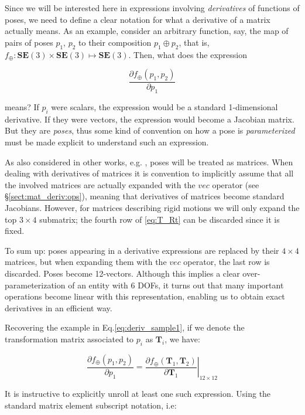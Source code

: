 \documentclass[a4paper,11pt]{report}
\begin{document}
Since we will be interested here in expressions involving \emph{derivatives} of functions of poses,
we need to define a clear notation for what a derivative of a matrix actually means.
As an example, consider an arbitrary function, say,
the map of pairs of poses $p_1$, $p_2$ to their composition $p_1 \oplus p_2$, that is,
$f_\oplus: \mathbf{SE}(3) \times \mathbf{SE}(3) \mapsto \mathbf{SE}(3)$.
Then, what does the expression

\begin{equation}
\label{eq:deriv_sample1}
\frac{\partial f_\oplus(p_1,p_2)}{\partial p_1}
\end{equation}

\noindent means?
If $p_i$ were scalars, the expression would be a standard 1-dimensional derivative.
If they were vectors, the expression would become a Jacobian matrix.
But they are \emph{poses}, thus some kind of convention on how a pose is \emph{parameterized}
must be made explicit to understand such an expression.

As also considered in other works, e.g. \cite{strasdat2010scale}, poses will be treated
as matrices.
When dealing with derivatives of matrices it is convention to implicitly assume
that all the involved matrices are actually expanded with the $vec$ operator (see \S\ref{sect:mat_deriv:ops}),
meaning that derivatives of matrices become standard Jacobians.
However, for matrices describing rigid motions we will only expand
the top $3 \times 4$ submatrix; the fourth row of \ref{eq:T_Rt} can be discarded since it is fixed.

To sum up: poses appearing in a derivative expressions are replaced by their $4 \times 4$
matrices, but when expanding them with the $vec$ operator, the last row is discarded.
Poses become 12-vectors.
Although this implies a clear over-parameterization of an entity with 6 DOFs, it turns
out that many important operations become linear with this representation, enabling us to
obtain exact derivatives in an efficient way.

Recovering the example in Eq.\ref{eq:deriv_sample1}, if we denote the
transformation matrix associated to $p_i$ as $\mathbf{T}_i$, we have:

\begin{equation}
\label{eq:deriv_sample2}
\frac{\partial f_\oplus(p_1,p_2)}{\partial p_1} =
\left.
\frac{\partial f_\oplus(\mathbf{T}_1,\mathbf{T}_2)}{\partial \mathbf{T}_1}
\right|_{12 \times 12}
\end{equation}

It is instructive to explicitly unroll at least one such expression.
Using the standard matrix element subscript notation, i.e:
\end{document}
